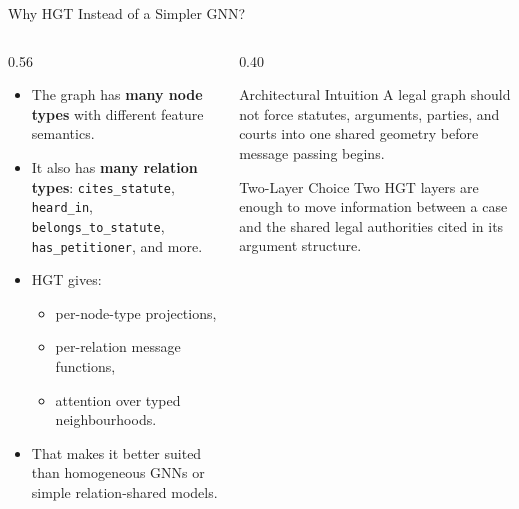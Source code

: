 \documentclass[aspectratio=169,11pt]{beamer}
\newenvironment{tightitemize}{
  \begin{itemize}
    \setlength{\itemsep}{2pt}
    \setlength{\parskip}{0pt}
}{\end{itemize}}
\newcommand{\highlight}[1]{\textcolor{ThesisBlue}{\textbf{#1}}}
\begin{document}
\begin{frame}{Why HGT Instead of a Simpler GNN?}
  \begin{columns}[T]
    \begin{column}{0.56\textwidth}
      \begin{tightitemize}
        \item The graph has \highlight{many node types} with different feature semantics.
        \item It also has \highlight{many relation types}: \texttt{cites\_statute}, \texttt{heard\_in}, \texttt{belongs\_to\_statute}, \texttt{has\_petitioner}, and more.
        \item HGT gives:
        \begin{tightitemize}
          \item per-node-type projections,
          \item per-relation message functions,
          \item attention over typed neighbourhoods.
        \end{tightitemize}
        \item That makes it better suited than homogeneous GNNs or simple relation-shared models.
      \end{tightitemize}
    \end{column}
    \begin{column}{0.40\textwidth}
      \begin{block}{Architectural Intuition}
        A legal graph should not force statutes, arguments, parties, and courts into one shared geometry before message passing begins.
      \end{block}
      \begin{block}{Two-Layer Choice}
        Two HGT layers are enough to move information between a case and the shared legal authorities cited in its argument structure.
      \end{block}
    \end{column}
  \end{columns}
\end{frame}
\end{document}
